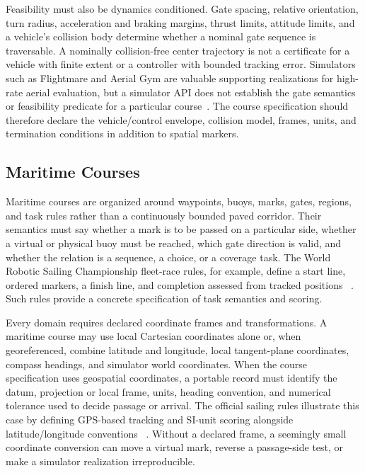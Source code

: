 Feasibility must also be dynamics conditioned.  Gate spacing, relative
orientation, turn radius, acceleration and braking margins, thrust limits,
attitude limits, and a vehicle's collision body determine whether a nominal gate
sequence is traversable.  A nominally collision-free center trajectory is not a
certificate for a vehicle with finite extent or a controller with bounded
tracking error.  Simulators such as Flightmare and Aerial Gym are valuable
supporting realizations for high-rate aerial evaluation, but a simulator API does
not establish the gate semantics or feasibility predicate for a particular
course~\cite{Song2021FlightmareFlexible,Kulkarni2025AerialGym}.  The course
specification should therefore declare the vehicle/control envelope, collision
model, frames, units, and termination conditions in addition to spatial markers.

\subsection{Maritime Courses}

Maritime courses are organized around waypoints, buoys, marks, gates, regions,
and task rules rather than a continuously bounded paved corridor.  Their
semantics must say whether a mark is to be passed on a particular side, whether a
virtual or physical buoy must be reached, which gate direction is valid, and
whether the relation is a sequence, a choice, or a coverage task.  The World
Robotic Sailing Championship fleet-race rules, for example, define a start line,
ordered markers, a finish line, and completion assessed from tracked positions
~\cite{WRSCIRSCOrganizingCommittee2019WorldRobotic}.  Such rules provide a
concrete specification of task semantics and scoring.

Every domain requires declared coordinate frames and transformations. A maritime
course may use local Cartesian coordinates alone or, when georeferenced, combine
latitude and longitude, local tangent-plane coordinates, compass headings, and
simulator world coordinates. When the course specification uses geospatial
coordinates, a portable record must identify the datum, projection or local frame,
units, heading convention, and numerical tolerance used to decide passage or
arrival. The official sailing rules illustrate this case by defining GPS-based
tracking and SI-unit scoring alongside latitude/longitude conventions
~\cite{WRSCIRSCOrganizingCommittee2019WorldRobotic}.  Without a declared frame,
a seemingly small coordinate conversion can move a virtual mark, reverse a
passage-side test, or make a simulator realization irreproducible.

